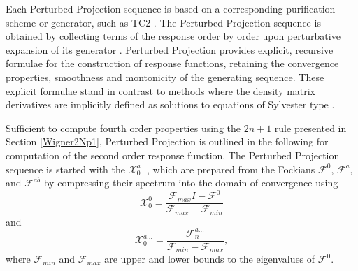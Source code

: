 \documentclass[prl,aps,preprint,showpacs,superbib]{revtex4}
\def\F{\mathcal{F}}
\def\X{\mathcal{X}}
\begin{document}
Each Perturbed Projection sequence is based on a corresponding  purification scheme or generator, such as TC2 \cite{ANiklasson02A}.   
The Perturbed Projection sequence is obtained by collecting terms of the response order by 
order upon perturbative expansion of its generator \cite{ANiklasson04}.
Perturbed Projection provides explicit, recursive formulae 
for the construction of response functions, retaining the convergence properties,  smoothness and 
montonicity of the generating sequence.   These explicit formulae stand in contrast to methods where the 
density matrix derivatives are implicitly defined as solutions to equations of Sylvester type \cite{Ochsenfeld97,HLarsen01a,COchsenfeld04}.

Sufficient to compute fourth order properties using the $2 n+1$ rule presented in Section \ref{Wigner2Np1}, 
Perturbed Projection is outlined in the following for computation of the second order response function.  
The Perturbed Projection sequence is started with the  $\X^{a\ldots}_{0}$, which are 
prepared from the Fockians $\F^0$, $\F^a$, and $\F^{ab}$ by  compressing their spectrum into the domain of 
convergence \cite{ANiklasson02A} using
\begin{equation}
    \X^0_{0}=\frac{\F_{max}I-\F^0}{\F_{max}-\F_{min}} 
\end{equation}
and 
\begin{equation}
    \X^{a\ldots}_{0}=\frac{\F^{a\ldots}_{n}}{\F_{min}-\F_{max}},
\end{equation}
where $\F_{min}$ and $\F_{max}$ are upper and lower bounds to the eigenvalues of $\F^0$.  
\end{document}
